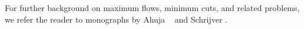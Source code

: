 \documentclass[11pt,twoside]{article}
\begin{document}
For further background on maximum flows, minimum cuts, and related problems, we refer the reader to monographs by Ahuja \etal\ \cite{amo-nftaa-93} and Schrijver \cite{s-cape-03}.
%
%
%
%
%
%
%
\end{document}
